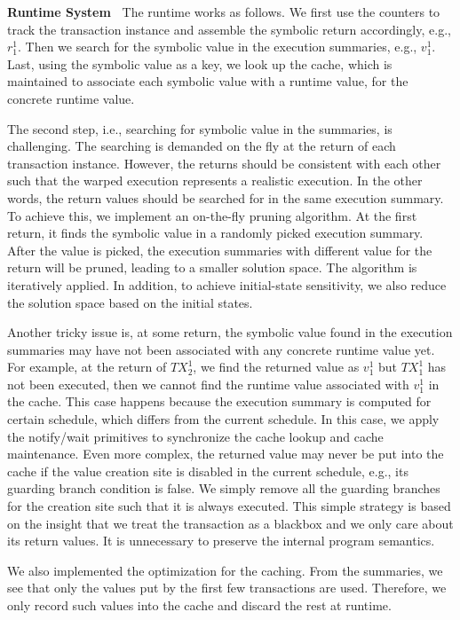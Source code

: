 {\bf Runtime System\ }
The runtime works as follows. We first use the counters to track the transaction instance and assemble the symbolic return accordingly, e.g., $r^1_1$.
Then we search for the symbolic value in the execution summaries, e.g., $v^1_1$. Last, using the symbolic value as a key, we look up the cache, which is maintained to associate each symbolic value with a runtime value, for the concrete runtime value.

The second step, i.e., searching for symbolic value in the summaries, is challenging. The searching is demanded on the fly at the return of each transaction instance. 
However, the returns should be consistent with each other such that the warped execution represents a realistic execution. In the other words, the return values should be searched for in the same execution summary. To achieve this, we implement an on-the-fly pruning algorithm. At the first return, it finds the symbolic value in a randomly picked execution summary. After the value is picked, the execution summaries with different value for the return will be pruned, leading to a smaller solution space. 
The algorithm is iteratively applied. In addition, to achieve initial-state sensitivity, we also reduce the solution space based on the initial states. 

Another tricky issue is, at some return, the symbolic value found in the execution summaries may have not been associated with any concrete runtime value yet.
For example, at the return of $TX^1_2$, we find the returned value as $v^1_1$ but $TX^1_1$ has not been executed, then we cannot find the runtime value associated with $v^1_1$ in the cache. This case happens because the execution summary is computed for certain schedule, which differs from the current schedule. In this case, we apply the notify/wait primitives to synchronize the cache lookup and cache maintenance. Even more complex, the returned value may never be put into the cache if the value creation site is disabled in the current schedule, e.g., its guarding branch condition is false. We simply remove all the guarding branches for the creation site such that it is always executed. This simple strategy is based on the insight that we treat the transaction as a blackbox and we only care about its return values. It is unnecessary to preserve the internal program semantics.


We also implemented the optimization for the caching. From the summaries, we see that only the values put by the first few transactions are used. Therefore, we only record such values into the cache and discard the rest at runtime.






